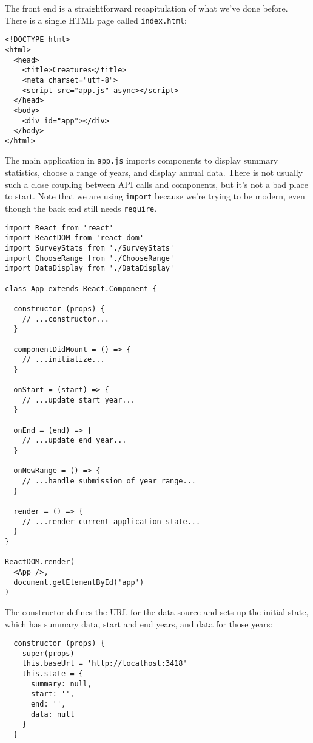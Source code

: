 The front end is a straightforward recapitulation of what we've done before.
There is a single HTML page called \texttt{index.html}:

\begin{verbatim}
<!DOCTYPE html>
<html>
  <head>
    <title>Creatures</title>
    <meta charset="utf-8">
    <script src="app.js" async></script>
  </head>
  <body>
    <div id="app"></div>
  </body>
</html>
\end{verbatim}

The main application in \texttt{app.js} imports components to display summary statistics,
choose a range of years,
and display annual data.
There is not usually such a close coupling between API calls and components,
but it's not a bad place to start.
Note that we are using \texttt{import} because we're trying to be modern,
even though the back end still needs \texttt{require}.

\begin{verbatim}
import React from 'react'
import ReactDOM from 'react-dom'
import SurveyStats from './SurveyStats'
import ChooseRange from './ChooseRange'
import DataDisplay from './DataDisplay'

class App extends React.Component {

  constructor (props) {
    // ...constructor...
  }

  componentDidMount = () => {
    // ...initialize...
  }

  onStart = (start) => {
    // ...update start year...
  }

  onEnd = (end) => {
    // ...update end year...
  }

  onNewRange = () => {
    // ...handle submission of year range...
  }

  render = () => {
    // ...render current application state...
  }
}

ReactDOM.render(
  <App />,
  document.getElementById('app')
)
\end{verbatim}

The constructor defines the URL for the data source and sets up the initial state,
which has summary data,
start and end years,
and data for those years:

\begin{verbatim}
  constructor (props) {
    super(props)
    this.baseUrl = 'http://localhost:3418'
    this.state = {
      summary: null,
      start: '',
      end: '',
      data: null
    }
  }
\end{verbatim}

